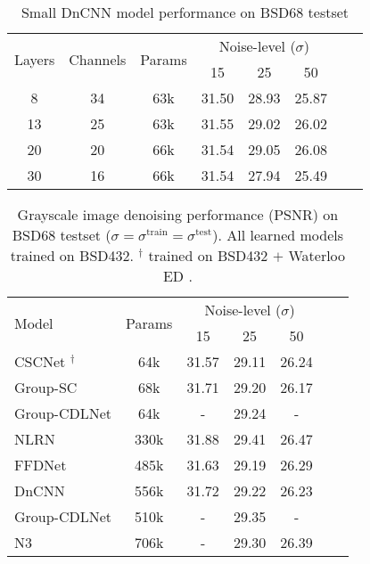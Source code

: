 \documentclass[12pt,a4paper,leqno]{amsart}
\author{Nikola Janju\v{s}evi\'{c}}
\date{\today}
\begin{document}
\begin{table}
\centering
\caption{Small DnCNN model performance on BSD68 testset}
\begin{tabular}{cccccccc} \hline
\multirow{2}{*}{Layers} & \multirow{2}{*}{Channels} & \multirow{2}{*}{Params}&\multicolumn{3}{c}{Noise-level ($\sigma$)} \\
   &    &     & 15    & 25    & 50 \\ \hline
8  & 34 & 63k & 31.50 & 28.93 & 25.87 \\
13 & 25 & 63k & 31.55 & 29.02 & 26.02 \\
20 & 20 & 66k & 31.54 & 29.05 & 26.08 \\
30 & 16 & 66k & 31.54 & 27.94 & 25.49 \\\hline
\end{tabular}
\end{table}



\begin{table}
\centering
\caption{Grayscale image denoising performance (PSNR) on BSD68 testset ($\sigma
= \sigma^{\mathrm{train}} = \sigma^{\mathrm{test}}$). All learned models
trained on BSD432\cite{bsd}. $^\dagger$ trained on BSD432 $+$ Waterloo ED
\cite{ma2017waterloo}.}
\begin{tabular}{lcccccc} \hline
\multirow{2}{*}{Model} & \multirow{2}{*}{Params} & \multicolumn{3}{c}{Noise-level ($\sigma$)} \\
 & & 15 & 25 & 50 \\ \hline
CSCNet \cite{Simon2019}$^\dagger$ & 64k & 31.57 & 29.11 & 26.24 \\
Group-SC \cite{mairal} & 68k & 31.71 & 29.20 & 26.17 \\ 
Group-CDLNet & 64k & - & 29.24 &  - \\\hline
NLRN                 & 330k& 31.88 & 29.41 & 26.47 \\
FFDNet \cite{FFDNet} & 485k& 31.63 & 29.19 & 26.29 \\
DnCNN \cite{DnCNN} & 556k& 31.72& 29.22 & 26.23 \\
Group-CDLNet & 510k & - & 29.35 &  - \\
N3 & 706k & - & 29.30 & 26.39 \\\hline
\end{tabular}
\end{table}
\end{document}
